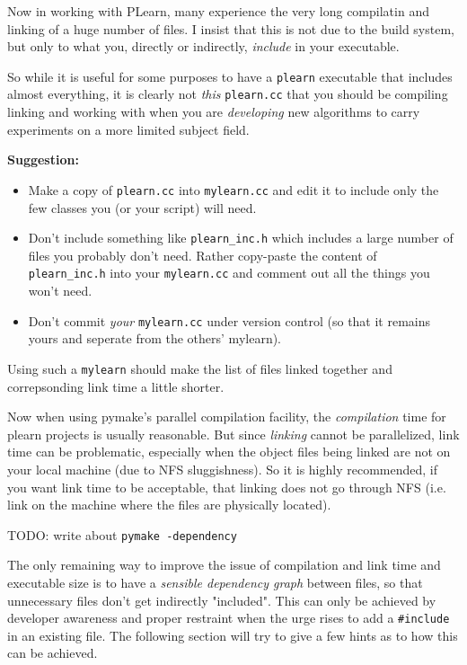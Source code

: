 \documentclass[11pt]{book}
\begin{document}
Now in working with PLearn, many experience the very long compilatin and
linking of a huge number of files. I insist that this is not due to the
build system, but only to what you, directly or indirectly, {\em include}
in your executable.

So while it is useful for some purposes to have a {\tt plearn} executable that
includes almost everything, it is clearly not {\em this} {\tt plearn.cc} that you
should be compiling linking and working with when you are {\em developing} new
algorithms to carry experiments on a more limited subject field.

{\bf Suggestion:} 
\begin{itemize}
\item Make a copy of {\tt plearn.cc} into {\tt mylearn.cc} and edit it to
include only the few classes you (or your script) will need.
\item Don't include something like {\tt plearn\_inc.h} which includes a large number of
files you probably don't need. Rather copy-paste the content of {\tt
plearn\_inc.h} into your {\tt mylearn.cc} and comment out all the things
you won't need.
\item Don't commit {\em your} {\tt mylearn.cc} under version control (so
  that it remains yours and seperate from the others' mylearn).
\end{itemize}

Using such a {\tt mylearn} should make the list of files linked together
and correpsonding link time a little shorter.

Now when using pymake's parallel compilation facility, the {\em
compilation} time for plearn projects is usually reasonable. But since {\em
linking} cannot be parallelized, link time can be problematic, especially
when the object files being linked are not on your local machine (due to
NFS sluggishness). So it is highly recommended, if you want link time to be
acceptable, that linking does not go through NFS (i.e. link on the machine
where the files are physically located).

TODO: write about {\tt pymake -dependency}

The only remaining way to improve the issue of compilation and link time
and executable size is to have a {\em sensible dependency graph} between
files, so that unnecessary files don't get indirectly "included". This can
only be achieved by developer awareness and proper restraint when the urge
rises to add a {\tt \#include} in an existing file. The following section
will try to give a few hints as to how this can be achieved.
\end{document}
